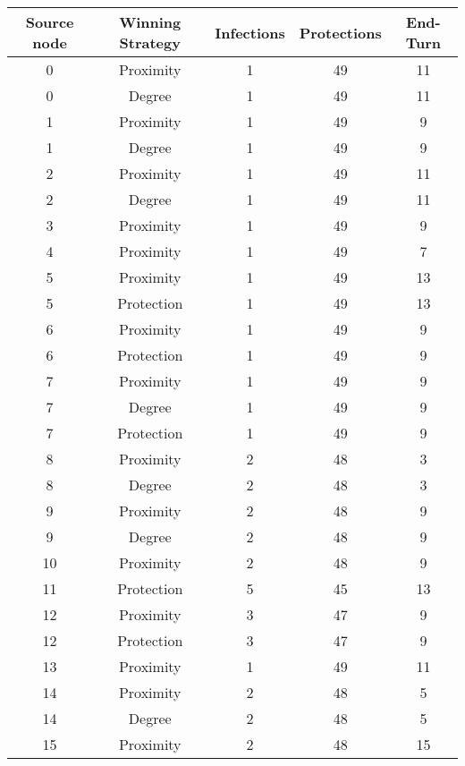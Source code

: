 \documentclass[results.tex]{subfiles}
\begin{document}
\begin{center}
  \begin{tabular}{| c || c | c | c | c |}
    \hline
    {\bfseries Source node} & {\bfseries Winning Strategy} & {\bfseries Infections} & {\bfseries Protections} & {\bfseries End-Turn} \\  %
    \hline\hline
    0 & Proximity & 1 & 49 & 11 \\ 
    \hline
    0 & Degree & 1 & 49 & 11 \\ 
    \hline
    1 & Proximity & 1 & 49 & 9 \\ 
    \hline
    1 & Degree & 1 & 49 & 9 \\ 
    \hline
    2 & Proximity & 1 & 49 & 11 \\ 
    \hline
    2 & Degree & 1 & 49 & 11 \\ 
    \hline
    3 & Proximity & 1 & 49 & 9 \\ 
    \hline
    4 & Proximity & 1 & 49 & 7 \\ 
    \hline
    5 & Proximity & 1 & 49 & 13 \\ 
    \hline
    5 & Protection & 1 & 49 & 13 \\ 
    \hline
    6 & Proximity & 1 & 49 & 9 \\ 
    \hline
    6 & Protection & 1 & 49 & 9 \\ 
    \hline
    7 & Proximity & 1 & 49 & 9 \\ 
    \hline
    7 & Degree & 1 & 49 & 9 \\ 
    \hline
    7 & Protection & 1 & 49 & 9 \\ 
    \hline
    8 & Proximity & 2 & 48 & 3 \\ 
    \hline
    8 & Degree & 2 & 48 & 3 \\ 
    \hline
    9 & Proximity & 2 & 48 & 9 \\ 
    \hline
    9 & Degree & 2 & 48 & 9 \\ 
    \hline
    10 & Proximity & 2 & 48 & 9 \\ 
    \hline
    11 & Protection & 5 & 45 & 13 \\ 
    \hline
    12 & Proximity & 3 & 47 & 9 \\ 
    \hline
    12 & Protection & 3 & 47 & 9 \\ 
    \hline
    13 & Proximity & 1 & 49 & 11 \\ 
    \hline
    14 & Proximity & 2 & 48 & 5 \\ 
    \hline
    14 & Degree & 2 & 48 & 5 \\ 
    \hline
    15 & Proximity & 2 & 48 & 15 \\ 

\end{tabular}
\end{center}
\end{document}
